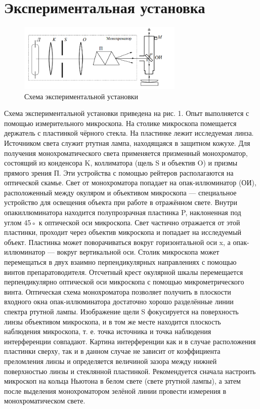 \documentclass[a4paper,12pt]{article} %
\begin{document}
\section{Экспериментальная установка}
\begin{figure}[h]
    \centering
    \includegraphics[width=0.7\textwidth]{установка.png}
    \caption{Схема экспериментальной установки}
    \label{setup}
\end{figure}
Схема экспериментальной установки приведена на рис. 1. Опыт выполняется с помощью измерительного
микроскопа. На столике микроскопа помещается держатель с пластинкой чёрного стекла. На пластинке лежит исследуемая линза.
Источником света служит ртутная лампа, находящаяся в защитном кожухе. Для получения монохроматического света применяется
призменный монохроматор, состоящий из конденсора K, коллиматора (щель S и объектив O) и призмы прямого зрения П. Эти устройства с помощью рейтеров располагаются на оптической скамье. Свет от
монохроматора попадает на опак-иллюминатор (ОИ), расположенный
между окуляром и объективом микроскопа — специальное устройство
для освещения объекта при работе в отражённом свете. Внутри опакиллюминатора находится полупрозрачная пластинка P, наклоненная
под углом 45◦ к оптической оси микроскопа. Свет частично отражается от этой пластинки, проходит через объектив микроскопа и попадает
на исследуемый объект. Пластинка может поворачиваться вокруг горизонтальной оси x, а опак-иллюминатор — вокруг вертикальной оси.
Столик микроскопа может перемещаться в двух взаимно перпендикулярных направлениях с помощью винтов препаратоводителя. Отсчетный крест окулярной шкалы перемещается перпендикулярно оптической оси микроскопа с помощью микрометрического винта.
Оптическая схема монохроматора позволяет получить в плоскости
входного окна опак-иллюминатора достаточно хорошо разделённые линии спектра ртутной лампы. Изображение щели S фокусируется на поверхность линзы объективом микроскопа, и в том же месте находится
плоскость наблюдения микроскопа, т. е. точка источника и точка наблюдения интерференции совпадают. Картина интерференции как и в
случае расположения пластинки сверху, так и в данном случае не зависит от коэффициента преломления линзы и определяется величиной
зазора между нижней поверхностью линзы и стеклянной пластинкой.
Рекомендуется сначала настроить микроскоп на кольца Ньютона в
белом свете (свете ртутной лампы), а затем после выделения монохроматором зелёной линии провести измерения в монохроматическом свете.
\end{document}
